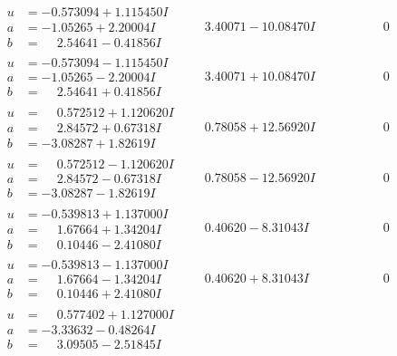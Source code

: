 \documentclass[1p]{elsarticle_modified}
\theoremstyle{definition}
\begin{document}
$$\begin{array}{c|c|c}
\begin{aligned}
u &= -0.573094 + 1.115450 I \\
a &= -1.05265 + 2.20004 I \\
b &= \phantom{-}2.54641 - 0.41856 I\end{aligned}
 & \phantom{-}3.40071 - 10.08470 I & \phantom{-0.000000 } 0 \\ \hline\begin{aligned}
u &= -0.573094 - 1.115450 I \\
a &= -1.05265 - 2.20004 I \\
b &= \phantom{-}2.54641 + 0.41856 I\end{aligned}
 & \phantom{-}3.40071 + 10.08470 I & \phantom{-0.000000 } 0 \\ \hline\begin{aligned}
u &= \phantom{-}0.572512 + 1.120620 I \\
a &= \phantom{-}2.84572 + 0.67318 I \\
b &= -3.08287 + 1.82619 I\end{aligned}
 & \phantom{-}0.78058 + 12.56920 I & \phantom{-0.000000 } 0 \\ \hline\begin{aligned}
u &= \phantom{-}0.572512 - 1.120620 I \\
a &= \phantom{-}2.84572 - 0.67318 I \\
b &= -3.08287 - 1.82619 I\end{aligned}
 & \phantom{-}0.78058 - 12.56920 I & \phantom{-0.000000 } 0 \\ \hline\begin{aligned}
u &= -0.539813 + 1.137000 I \\
a &= \phantom{-}1.67664 + 1.34204 I \\
b &= \phantom{-}0.10446 - 2.41080 I\end{aligned}
 & \phantom{-}0.40620 - 8.31043 I & \phantom{-0.000000 } 0 \\ \hline\begin{aligned}
u &= -0.539813 - 1.137000 I \\
a &= \phantom{-}1.67664 - 1.34204 I \\
b &= \phantom{-}0.10446 + 2.41080 I\end{aligned}
 & \phantom{-}0.40620 + 8.31043 I & \phantom{-0.000000 } 0 \\ \hline\begin{aligned}
u &= \phantom{-}0.577402 + 1.127000 I \\
a &= -3.33632 - 0.48264 I \\
b &= \phantom{-}3.09505 - 2.51845 I\end{aligned}

\end{array}$$
\end{document}
